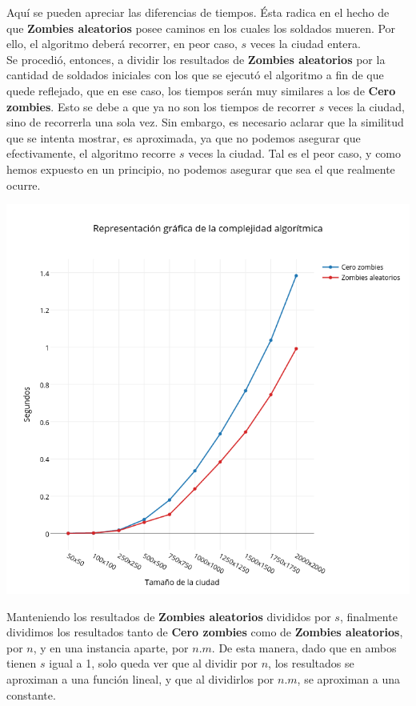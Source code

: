 Aquí se pueden apreciar las diferencias de tiempos. Ésta radica en el hecho de que \textbf{Zombies aleatorios} posee caminos en los cuales los soldados mueren. Por ello, el algoritmo deberá recorrer, en peor caso, $s$ veces la ciudad entera.\\

Se procedió, entonces, a dividir los resultados de \textbf{Zombies aleatorios} por la cantidad de soldados iniciales con los que se ejecutó el algoritmo a fin de que quede reflejado, que en ese caso, los tiempos serán muy similares a los de \textbf{Cero zombies}. Esto se debe a que ya no son los tiempos de recorrer $s$ veces la ciudad, sino de recorrerla una sola vez.
Sin embargo, es necesario aclarar que la similitud que se intenta mostrar, es aproximada, ya que no podemos asegurar que efectivamente, el algoritmo recorre $s$ veces la ciudad. Tal es el peor caso, y como hemos expuesto en un principio, no podemos asegurar que sea el que realmente ocurre.

\includegraphics[width=15cm,keepaspectratio=yes]{imagenes/ej2/zaczados.png}

Manteniendo los resultados de \textbf{Zombies aleatorios} divididos por $s$, finalmente dividimos los resultados tanto de \textbf{Cero zombies} como de \textbf{Zombies aleatorios}, por $n$, y en una instancia aparte, por $n.m$.
De esta manera, dado que en ambos tienen $s$ igual a 1, solo queda ver que al dividir por $n$, los resultados se aproximan a una función lineal, y que al dividirlos por $n.m$, se aproximan a una constante.\\

